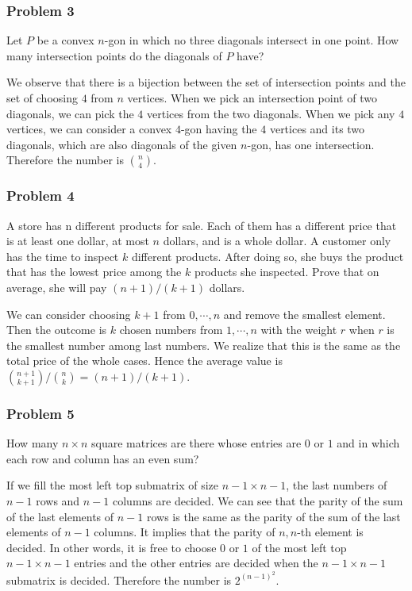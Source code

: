 \documentclass[12pt]{article}
\begin{document}
\subsubsection*{Problem 3}
Let $P$ be a convex $n$-gon in which no three diagonals intersect in one point. How many intersection points do the diagonals of $P$ have?
\begin{solution}
We observe that there is a bijection between the set of intersection points and the set of choosing $4$ from $n$ vertices. When we pick an intersection point of two diagonals, we can pick the $4$ vertices from the two diagonals. When we pick any $4$ vertices, we can consider a convex $4$-gon having the $4$ vertices and its two diagonals, which are also diagonals of the given $n$-gon, has one intersection. Therefore the number is $n \choose 4$.
\end{solution}

\subsubsection*{Problem 4}
A store has n different products for sale. Each of them has a different price that is at least one dollar, at most $n$ dollars, and is a whole dollar. A customer only has the time to inspect $k$ different products. After doing so, she buys the product that has the lowest
price among the $k$ products she inspected. Prove that on average, she will pay $(n+1)/(k+1)$ dollars.
\begin{solution}
We can consider choosing $k+1$ from $0, \cdots, n$ and remove the smallest element. Then the outcome is $k$ chosen numbers from $1, \cdots, n$ with the weight $r$ when $r$ is the smallest number among last numbers. We realize that this is the same as the total price of the whole cases. Hence the average value is ${n+1 \choose k+1} / {n \choose k} = (n+1)/(k+1)$.
\end{solution}

\subsubsection*{Problem 5}
How many $n \times n$ square matrices are there whose entries are $0$ or $1$ and in which each row and column has an even sum?
\begin{solution}
If we fill the most left top submatrix of size $n-1 \times n-1$, the last numbers of $n-1$ rows and $n-1$ columns are decided. We can see that the parity of the sum of the last elements of $n-1$ rows is the same as the parity of the sum of the last elements of $n-1$ columns. It implies that the parity of $n, n$-th element is decided. In other words, it is free to choose $0$ or $1$ of the most left top $n-1 \times n-1$ entries and the other entries are decided when the $n-1 \times n-1$ submatrix is decided. Therefore the number is $2^{(n-1)^2}$.
\end{solution}
\end{document}
